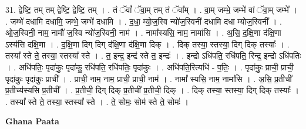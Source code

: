 \documentclass[17pt]{extarticle}
\begin{document}
31. द्वेष्टि॒ तम् तम् द्वेष्टि॒ द्वेष्टि॒ तम् । . तं ॅवां᳚ ॅवा॒म् तम् तं ॅवा᳚म् । . वा॒म् जम्भे॒ जम्भे॑ वां ॅवा॒म् जम्भे᳚ । . जम्भे॑ दधामि दधामि॒ जम्भे॒ जम्भे॑ दधामि । . द॒धा॒ म्यो॒ज॒स्वि न्यो॑ज॒स्विनी॑ दधामि दधा म्योज॒स्विनी᳚ । . ओ॒ज॒स्विनी॒ नाम॒ नामौ॑ ज॒स्वि न्यो॑ज॒स्विनी॒ नाम॑ । . नामा᳚स्यसि॒ नाम॒ नामा॑सि । . अ॒सि॒ द॒क्षि॒णा द॑क्षि॒णा ऽस्य॑सि दक्षि॒णा । . द॒क्षि॒णा दिग् दिग् द॑क्षि॒णा द॑क्षि॒णा दिक् । . दिक् तस्या॒ स्तस्या॒ दिग् दिक् तस्याः᳚ । . तस्या᳚ स्ते ते॒ तस्या॒ स्तस्या᳚ स्ते । . त॒ इन्द्र॒ इन्द्र॑ स्ते त॒ इन्द्रः॑ । . इन्द्रो ऽधि॑पति॒ रधि॑पति॒ रिन्द्र॒ इन्द्रो ऽधि॑पतिः । . अधि॑पतिः॒ पृदा॑कुः॒ पृदा॑कु॒ रधि॑पति॒ रधि॑पतिः॒ पृदा॑कुः । . अधि॑पति॒रित्यधि॑ - प॒तिः॒ । . पृदा॑कुः॒ प्राची॒ प्राची॒ पृदा॑कुः॒ पृदा॑कुः॒ प्राची᳚ । . प्राची॒ नाम॒ नाम॒ प्राची॒ प्राची॒ नाम॑ । . नामा᳚ स्यसि॒ नाम॒ नामा॑सि । . अ॒सि॒ प्र॒तीची᳚ प्र॒तीच्य॑स्यसि प्र॒तीची᳚ । . प्र॒तीची॒ दिग् दिक् प्र॒तीची᳚ प्र॒तीची॒ दिक् । . दिक् तस्या॒ स्तस्या॒ दिग् दिक् तस्याः᳚ । . तस्या᳚ स्ते ते॒ तस्या॒ स्तस्या᳚ स्ते । . ते॒ सोमः॒ सोम॑ स्ते ते॒ सोमः॑ । \newline

\textbf{Ghana Paata } \newline
\end{document}
